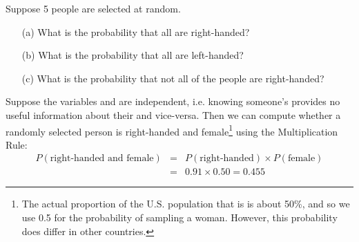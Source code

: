 \begin{exercisewrap}
\begin{nexercise} \label{ex5Handedness}
Suppose 5 people are selected at random.\footnotemark{}\vspace{-1.5mm}
\begin{enumerate}
\setlength{\itemsep}{0mm}
\item[(a)] What is the probability that all are right-handed?
\item[(b)] What is the probability that all are left-handed?
\item[(c)] What is the probability that not all of the people are right-handed?
\end{enumerate}
\end{nexercise}
\end{exercisewrap}

\D{\newpage}

Suppose the variables  and  are independent, i.e. knowing someone's  provides no useful information about their  and vice-versa. Then we can compute whether a randomly selected person is right-handed and female\footnote{The actual proportion of the U.S. population that is  is about 50\%, and so we use 0.5 for the probability of sampling a woman. However, this probability does differ in other countries.} using the Multiplication Rule:
\begin{eqnarray*}
P(\text{right-handed and female}) &=& P(\text{right-handed}) \times  P(\text{female}) \\
&=& 0.91 \times  0.50 = 0.455
\end{eqnarray*}


